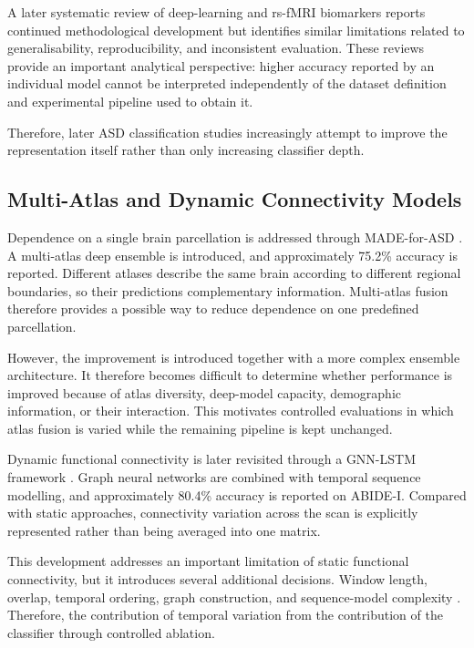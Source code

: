 A later systematic review of deep-learning and rs-fMRI biomarkers \cite{Hudaetal2024} reports continued methodological development but identifies similar limitations related to generalisability, reproducibility, and inconsistent evaluation. These reviews provide an important analytical perspective: higher accuracy reported by an individual model cannot be interpreted independently of the dataset definition and experimental pipeline used to obtain it.

Therefore, later ASD classification studies increasingly attempt to improve the representation itself rather than only increasing classifier depth.

\subsection{Multi-Atlas and Dynamic Connectivity Models}

Dependence on a single brain parcellation is addressed through MADE-for-ASD \cite{Liuetal2024MADE}. A multi-atlas deep ensemble is introduced, and approximately 75.2\% accuracy is reported. Different atlases describe the same brain according to different regional boundaries, so their predictions  complementary information. Multi-atlas fusion therefore provides a possible way to reduce dependence on one predefined parcellation.

However, the improvement is introduced together with a more complex ensemble architecture. It therefore becomes difficult to determine whether performance is improved because of atlas diversity, deep-model capacity, demographic information, or their interaction. This motivates controlled evaluations in which atlas fusion is varied while the remaining pipeline is kept unchanged.

Dynamic functional connectivity is later revisited through a GNN-LSTM framework \cite{Tangetal2025GNNLSTM}. Graph neural networks are combined with temporal sequence modelling, and approximately 80.4\% accuracy is reported on ABIDE-I. Compared with static approaches, connectivity variation across the scan is explicitly represented rather than being averaged into one matrix.

This development addresses an important limitation of static functional connectivity, but it introduces several additional decisions. Window length, overlap, temporal ordering, graph construction, and sequence-model complexity . Therefore, the contribution of temporal variation  from the contribution of the classifier through controlled ablation.

